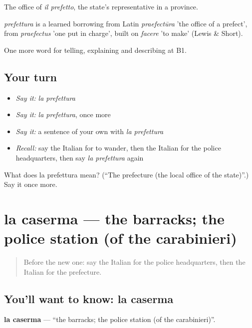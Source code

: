 The office of \emph{il prefetto}, the state's representative in a province.

\begin{cousinweb}
\emph{prefettura} is a learned borrowing from Latin \emph{praefectūra} 'the office of a prefect', from \emph{praefectus} 'one put in charge', built on \emph{facere} 'to make' (Lewis \& Short).
\end{cousinweb}

\begin{grammarlens}[title={What you've built}]
One more word for telling, explaining and describing at B1.
\end{grammarlens}

\subsection*{Your turn}
\begin{itemize}
\raggedright
  \item \emph{Say it:} \emph{la prefettura}
  \item \emph{Say it:} \emph{la prefettura}, once more
  \item \emph{Say it:} a sentence of your own with \emph{la prefettura}
  \item \emph{Recall:} say the Italian for to wander, then the Italian for the police headquarters, then say \emph{la prefettura} again
\end{itemize}

\begin{tcolorbox}[breakable,colback=teal!4,colframe=teal!35!black,title={Before you move on}]
What does la prefettura mean? (\textquotedblleft{}The prefecture (the local office of the state)\textquotedblright{}.) Say it once more.
\end{tcolorbox}
\section[la caserma]{la caserma — the barracks; the police station (of the carabinieri)}

\label{lesson:IT-C447-caserma}



\begin{quote}
Before the new one: say the Italian for the police headquarters, then the Italian for the prefecture.
\end{quote}

\subsection*{You'll want to know: la caserma}
\textbf{la caserma} — \textquotedblleft{}the barracks; the police station (of the carabinieri)\textquotedblright{}.

